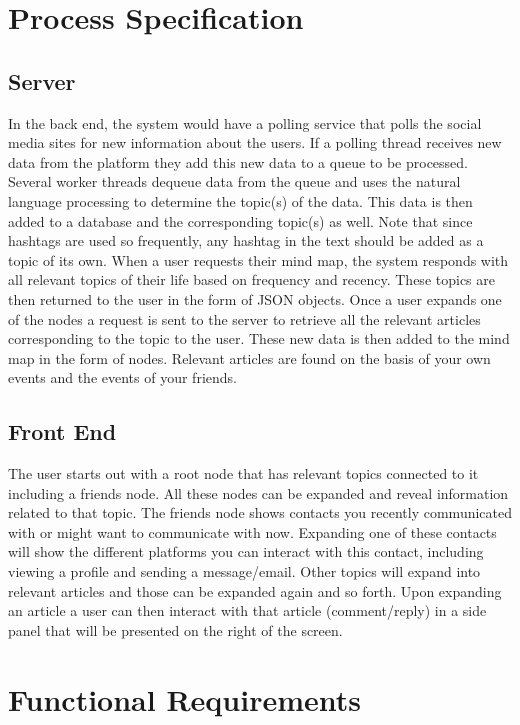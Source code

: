 \documentclass[hidelinks,english]{article}
\begin{document}
	
	\section{Process Specification}
		\subsection{Server}
		In the back end, the system would have a polling service that polls the social media sites for new information about the users. If a polling thread receives new data from the platform they add this new data to a queue to be processed. Several worker threads dequeue data from the queue and uses the natural language processing to determine the topic(s) of the data. This data is then added to a database and the corresponding topic(s) as well. Note that since hashtags are used so frequently, any hashtag in the text should be added as a topic of its own. When a user requests their mind map, the system responds with all relevant topics of their life based on frequency and recency. These topics are then returned to the user in the form of JSON objects. Once a user expands one of the nodes a request is sent to the server to retrieve all the relevant articles corresponding to the topic to the user. These new data is then added to the mind map in the form of nodes. Relevant articles are found on the basis of your own events and the events of your friends.
		
		\subsection{Front End}
		The user starts out with a root node that has relevant topics connected to it including a friends node. All these nodes can be expanded and reveal information related to that topic. The friends node shows contacts you recently communicated with or might want to communicate with now. Expanding one of these contacts will show the different platforms you can interact with this contact, including viewing a profile and sending a message/email. Other topics will expand into relevant articles and those can be expanded again and so forth. Upon expanding an article a user can then interact with that article (comment/reply) in a side panel that will be presented on the right of the screen.
	
	\section{Functional Requirements}		
		
\end{document}
